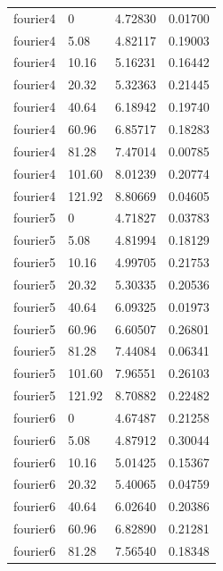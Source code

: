 \begin{onehalfspace}
\begin{longtable}{p{2.0cm} p{2.0cm} p{4.0cm} p{2.0cm} }
        \midrule
        fourier4  & 0            & 4.72830          & 0.01700 \\
        fourier4  & 5.08         & 4.82117          & 0.19003 \\
        fourier4  & 10.16        & 5.16231          & 0.16442 \\
        fourier4  & 20.32        & 5.32363          & 0.21445 \\
        fourier4  & 40.64        & 6.18942          & 0.19740 \\
        fourier4  & 60.96        & 6.85717          & 0.18283 \\
        fourier4  & 81.28        & 7.47014          & 0.00785 \\
        fourier4  & 101.60       & 8.01239          & 0.20774 \\
        fourier4  & 121.92       & 8.80669          & 0.04605 \\
        \midrule
        fourier5  & 0            & 4.71827          & 0.03783 \\
        fourier5  & 5.08         & 4.81994          & 0.18129 \\
        fourier5  & 10.16        & 4.99705          & 0.21753 \\
        fourier5  & 20.32        & 5.30335          & 0.20536 \\
        fourier5  & 40.64        & 6.09325          & 0.01973 \\
        fourier5  & 60.96        & 6.60507          & 0.26801 \\
        fourier5  & 81.28        & 7.44084          & 0.06341 \\
        fourier5  & 101.60       & 7.96551          & 0.26103 \\
        fourier5  & 121.92       & 8.70882          & 0.22482 \\
        \midrule
        fourier6  & 0            & 4.67487          & 0.21258 \\
        fourier6  & 5.08         & 4.87912          & 0.30044 \\
        fourier6  & 10.16        & 5.01425          & 0.15367 \\
        fourier6  & 20.32        & 5.40065          & 0.04759 \\
        fourier6  & 40.64        & 6.02640          & 0.20386 \\
        fourier6  & 60.96        & 6.82890          & 0.21281 \\
        fourier6  & 81.28        & 7.56540          & 0.18348 \\

\end{longtable}
\end{onehalfspace}

